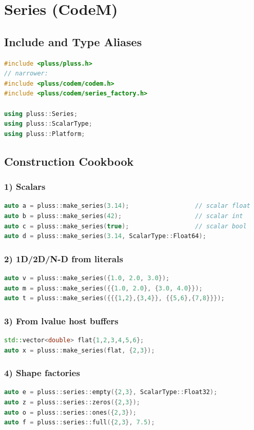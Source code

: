 \documentclass[11pt]{article}
\begin{document}
\section{Series (CodeM)}
\subsection{Include and Type Aliases}
\begin{lstlisting}[language=C++]
#include <pluss/pluss.h>
// narrower:
#include <pluss/codem/codem.h>
#include <pluss/codem/series_factory.h>

using pluss::Series;
using pluss::ScalarType;
using pluss::Platform;
\end{lstlisting}

\subsection{Construction Cookbook}
\subsubsection{1) Scalars}
\begin{lstlisting}[language=C++]
auto a = pluss::make_series(3.14);                  // scalar float
auto b = pluss::make_series(42);                    // scalar int
auto c = pluss::make_series(true);                  // scalar bool
auto d = pluss::make_series(3.14, ScalarType::Float64);
\end{lstlisting}

\subsubsection{2) 1D/2D/N-D from literals}
\begin{lstlisting}[language=C++]
auto v = pluss::make_series({1.0, 2.0, 3.0});
auto m = pluss::make_series({{1.0, 2.0}, {3.0, 4.0}});
auto t = pluss::make_series({{{1,2},{3,4}}, {{5,6},{7,8}}});
\end{lstlisting}

\subsubsection{3) From lvalue host buffers}
\begin{lstlisting}[language=C++]
std::vector<double> flat{1,2,3,4,5,6};
auto x = pluss::make_series(flat, {2,3});
\end{lstlisting}

\subsubsection{4) Shape factories}
\begin{lstlisting}[language=C++]
auto e = pluss::series::empty({2,3}, ScalarType::Float32);
auto z = pluss::series::zeros({2,3});
auto o = pluss::series::ones({2,3});
auto f = pluss::series::full({2,3}, 7.5);
\end{lstlisting}
\end{document}
